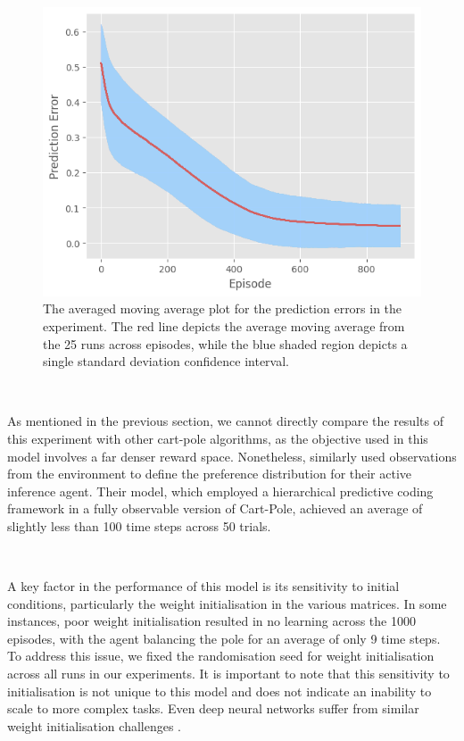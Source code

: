 \documentclass{article}
\begin{document}
\begin{figure}[htbp]
    \centering
        \begin{minipage}[c]{0.6\textwidth}
        \includegraphics[width=\textwidth]{images/pred_error.png}
    \end{minipage}
    \hfill
    \begin{minipage}[c]{0.35\textwidth}
        \caption{The averaged moving average plot for the prediction errors in the experiment. The red line depicts the average moving average from the 25 runs across episodes, while the blue shaded region depicts a single standard deviation confidence interval.}
        \label{fig:tpc_pred_error}
    \end{minipage}
\end{figure}

\

As mentioned in the previous section, we cannot directly compare the results of this experiment with other cart-pole algorithms, as the objective used in this model involves a far denser reward space. Nonetheless, \citet{millidge2024temporal} similarly used observations from the environment to define the preference distribution for their active inference agent. Their model, which employed a hierarchical predictive coding framework in a fully observable version of Cart-Pole, achieved an average of slightly less than 100 time steps across 50 trials.

\

A key factor in the performance of this model is its sensitivity to initial conditions, particularly the weight initialisation in the various matrices. In some instances, poor weight initialisation resulted in no learning across the 1000 episodes, with the agent balancing the pole for an average of only 9 time steps. To address this issue, we fixed the randomisation seed for weight initialisation across all runs in our experiments. It is important to note that this sensitivity to initialisation is not unique to this model and does not indicate an inability to scale to more complex tasks. Even deep neural networks suffer from similar weight initialisation challenges \citep{mishkin2016needgoodinit}.
\end{document}
